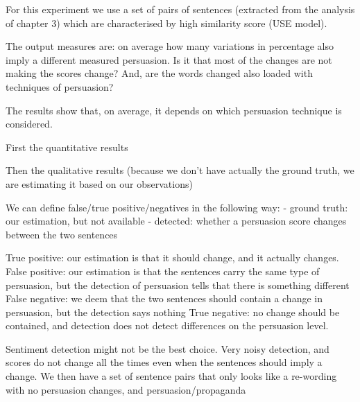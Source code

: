 For this experiment we use a set of pairs of sentences (extracted from the analysis of chapter 3) which are characterised by high similarity score (USE model). 


The output measures are: on average how many variations in percentage also imply a different measured persuasion. Is it that most of the changes are not making the scores change? And, are the words changed also loaded with techniques of persuasion? 

The results show that, on average, it depends on which persuasion technique is considered.

First the quantitative results


Then the qualitative results (because we don't have actually the ground truth, we are estimating it based on our observations)

We can define false/true positive/negatives in the following way:
- ground truth: our estimation, but not available
- detected: whether a persuasion score changes between the two sentences

True positive: our estimation is that it should change, and it actually changes.
False positive: our estimation is that the sentences carry the same type of persuasion, but the detection of persuasion tells that there is something different
False negative: we deem that the two sentences should contain a change in persuasion, but the detection says nothing
True negative: no change should be contained, and detection does not detect differences on the persuasion level.

Sentiment detection might not be the best choice. Very noisy detection, and scores do not change all the times even when the sentences should imply a change.
We then have a set of sentence pairs that only looks like a re-wording with no persuasion changes, and persuasion/propaganda 




